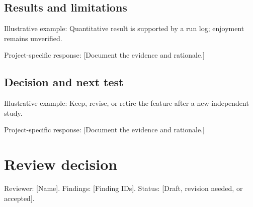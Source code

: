 \documentclass[11pt]{article}
\begin{document}
\subsection{Results and limitations}
Illustrative example: Quantitative result is supported by a run log; enjoyment remains unverified.

Project-specific response: [Document the evidence and rationale.]


\subsection{Decision and next test}
Illustrative example: Keep, revise, or retire the feature after a new independent study.

Project-specific response: [Document the evidence and rationale.]


\section{Review decision}
Reviewer: [Name]. Findings: [Finding IDs]. Status: [Draft, revision needed, or accepted].
\end{document}
